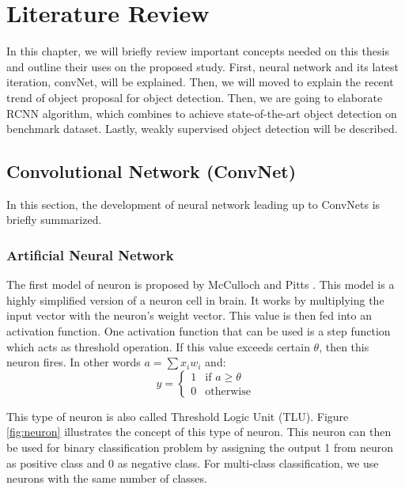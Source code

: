 \documentclass[a4paper,11pt]{kth-mag}
\begin{document}
\chapter{Literature Review}
In this chapter, we will briefly review important concepts needed on this thesis and outline their uses on the proposed study. First, neural network and its latest iteration, convNet, will be explained. Then, we will moved to explain the recent trend of object proposal for object detection. Then, we are going to elaborate RCNN algorithm, which combines to achieve state-of-the-art object detection on benchmark dataset. Lastly, weakly supervised object detection will be described.

\section{Convolutional Network (ConvNet)}
In this section, the development of neural network leading up to ConvNets is briefly summarized.

\subsection{Artificial Neural Network}
The first model of neuron is proposed by McCulloch and Pitts \cite{mcculloch1943neuron}. This model is a highly simplified version of a neuron cell in brain. It works by multiplying the input vector with the neuron's weight vector. This value is then fed into an activation function. One activation function that can be used is a step function which acts as threshold operation. If this value exceeds certain $\theta$, then this neuron fires. In other words $ a = \sum x_i w_i $ and:
\begin{equation}
\label{eq:y}
y = 
	\begin{cases}
	1 & \text{if } a \geq \theta \\
	0 & \text{otherwise}
	\end{cases}
\end{equation}

This type of neuron is also called Threshold Logic Unit (TLU). Figure \ref{fig:neuron} illustrates the concept of this type of neuron. This neuron can then be used for binary classification problem by assigning the output 1 from neuron as positive class and 0 as negative class. For multi-class classification, we use neurons with the same number of classes.
\end{document}
